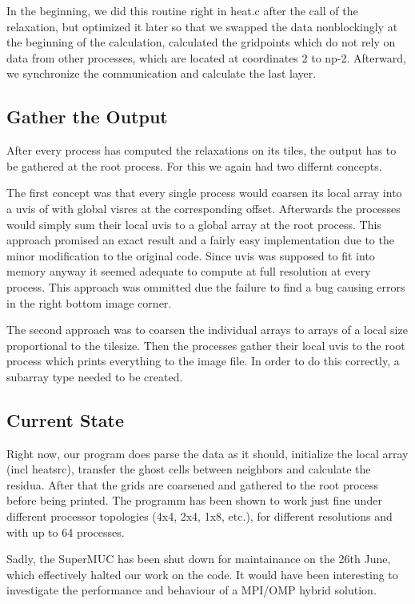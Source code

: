 In the beginning, we did this routine right in heat.c after the call of the relaxation, but optimized it later so that we swapped the data nonblockingly at the beginning of the calculation, calculated the gridpoints which do not rely on data from other processes, which are located at coordinates 2 to np-2.
Afterward, we synchronize the communication and calculate the last layer.

\subsection*{Gather the Output}

After every process has computed the relaxations on its tiles, the output has to be gathered at the root process. For this we again had two differnt concepts.

The first concept was that every single process would coarsen its local array into a uvis of with global visres at the corresponding offset. 
Afterwards the processes would simply sum their local uvis to a global array at the root process. 
This approach promised an exact result and a fairly easy implementation due to the minor modification to the original code. 
Since uvis was supposed to fit into memory anyway it seemed adequate to compute at full resolution at every process. 
This approach was ommitted due the failure to find a bug causing errors in the right bottom image corner.

The second approach was to coarsen the individual arrays to arrays of a local size proportional to the tilesize. Then the processes gather their local uvis to the root process which prints everything to the image file. 
In order to do this correctly, a subarray type needed to be created. 

\subsection*{Current State}
Right now, our program does parse the data as it should, initialize the local array (incl heatsrc), transfer the ghost cells between neighbors and calculate the residua. After that the grids are coarsened and gathered to the root process before being printed.
The programm has been shown to work just fine under different processor topologies (4x4, 2x4, 1x8, etc.), for different resolutions and with up to 64 processes.

Sadly, the SuperMUC has been shut down for maintainance on the 26th June, which effectively halted our work on the code. It would have been interesting to investigate the performance and behaviour of a MPI/OMP hybrid solution.

